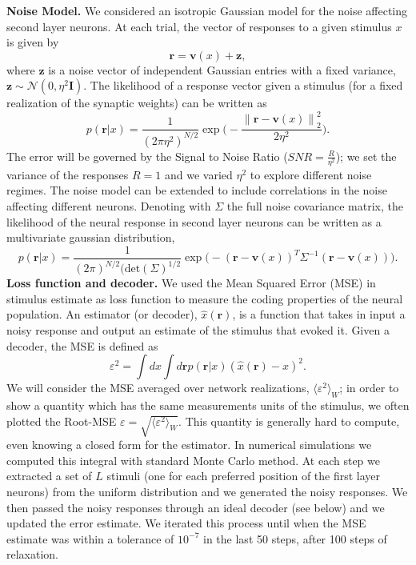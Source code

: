 \documentclass[a4paper]{article}%
\begin{document}
\textbf{Noise Model.} We considered an isotropic Gaussian model for the noise
affecting second layer neurons. At each trial, the vector of responses to a
given stimulus $x$ is given by
\begin{equation}
\mathbf{r} = \mathbf{v}(x) + \mathbf{z },\label{Eq:r}%
\end{equation}
where $\mathbf{z}$ is a noise vector of independent Gaussian entries with a
fixed variance, $\mathbf{z} \sim\mathcal{N}(0,\eta^{2}\mathbf{I})$. The
likelihood of a response vector given a stimulus (for a fixed realization of
the synaptic weights) can be written as
\begin{equation}
p(\mathbf{r}|x) = \frac{1}{(2\pi\eta^{2})^{N/2}} \exp\Big(- \frac{\left\|
\mathbf{r}-\mathbf{v}(x)\right\| _{2}^{2}}{2\eta^{2}} \Big).\label{Eq:L}%
\end{equation}
The error will be governed by the Signal to Noise Ratio ($SNR= \frac{R}%
{\eta^{2}}$); we set the variance of the responses $R=1$ and we varied
$\eta^{2}$ to explore different noise regimes. The noise model can be extended
to include correlations in the noise affecting different neurons. Denoting
with $\Sigma$ the full noise covariance matrix, the likelihood of the neural
response in second layer neurons can be written as a multivariate gaussian
distribution,
\begin{equation}
p(\mathbf{r}|x) = \frac{1}{(2\pi)^{N/2}(\text{det}(\Sigma)^{1/2}}
\exp\Big(-(\mathbf{r} - \mathbf{v}(x))^{T}\Sigma^{-1}(\mathbf{r} -
\mathbf{v}(x)) \Big).\label{Eq:LIn}%
\end{equation}
\newline\newline\textbf{Loss function and decoder.} We used the Mean Squared
Error (MSE) in stimulus estimate as loss function to measure the coding
properties of the neural population. An estimator (or decoder), $\hat
{x}(\mathbf{r})$, is a function that takes in input a noisy response and
output an estimate of the stimulus that evoked it. Given a decoder, the MSE is
defined as
\begin{equation}
\varepsilon^{2} = \int dx \int d\mathbf{r} p(\mathbf{r}|x) (\hat{x}%
(\mathbf{r}) -x)^{2}.\label{Eq:MSE}%
\end{equation}
We will consider the MSE averaged over network realizations, $\langle
\varepsilon^{2}\rangle_{W}$; in order to show a quantity which has the same
measurements units of the stimulus, we often plotted the Root-MSE
$\varepsilon= \sqrt{\langle\varepsilon^{2}\rangle_{W}}$. This quantity is
generally hard to compute, even knowing a closed form for the estimator. In
numerical simulations we computed this integral with standard Monte Carlo
method. At each step we extracted a set of $L$ stimuli (one for each preferred
position of the first layer neurons) from the uniform distribution and we
generated the noisy responses. We then passed the noisy responses through an
ideal decoder (see below) and we updated the error estimate. We iterated this
process until when the MSE estimate was within a tolerance of $10^{-7}$ in the
last 50 steps, after 100 steps of relaxation.
\end{document}
